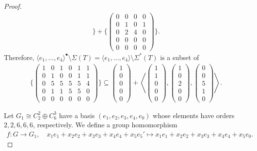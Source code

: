 \documentclass[10pt,a4paper]{amsart}
\begin{document}
\begin{proof}
\begin{align*}
	\}+  \{
	\left(\begin{array}{l|l|l|l}
		0 & 0 & 0 & 0\\
		0 & 1 & 0 & 1\\
		0 & 2 & 4 & 0\\
		0 & 0 & 0 & 0\\
		0 & 0 & 0 & 0
	\end{array}\right)
	\}.
\end{align*}
Therefore, $ \langle e_1, \ldots, e_4 \rangle^{\bullet} \setminus \Sigma (T)=\langle e_1, \ldots, e_4 \rangle \setminus \Sigma^* (T)$ is a subset of 
\begin{align*}
\{\left(\begin{array}{l|l|l|l|l|l}
	1 & 0 & 1 & 0 & 1 & 1\\
	0 & 1 & 0 & 0 & 1 & 1\\
	0 & 5 & 5 & 5 & 5 & 4\\
	0 & 1 & 1 & 5 & 5 & 0\\
	0 & 0 & 0 & 0 & 0 & 0
\end{array}\right)
\} \subseteq 
\left(\begin{array}{l}
	1 \\ 0 \\ 0 \\ 0 \\ 0 
\end{array}\right)
+\left\langle \left(\begin{array}{l}
	1 \\ 1 \\ 0 \\ 0 \\ 0 
\end{array}\right),
\left(\begin{array}{l}
	1 \\ 0 \\ 2 \\ 0 \\ 0 
\end{array}\right),
\left(\begin{array}{l}
	0 \\ 0 \\ 5 \\ 1 \\ 0 
\end{array}\right) \right\rangle.
\end{align*}


Let $G_1\cong C_2^2\oplus C_6^3$ have a basis $(e_1,e_2,e_3,e_4,e_0)$ whose elements have orders $2,2,6,6,6$, respectively.
We define a group homomorphism
\begin{align*}
f: G \to G_1,\quad x_1e_1+x_2e_2+x_3e_3+x_4e_4+x_5e_5' \longmapsto x_1e_1+x_2e_2+x_3e_3+x_4e_4+x_5 e_0.
\end{align*}



\end{proof}
\end{document}
